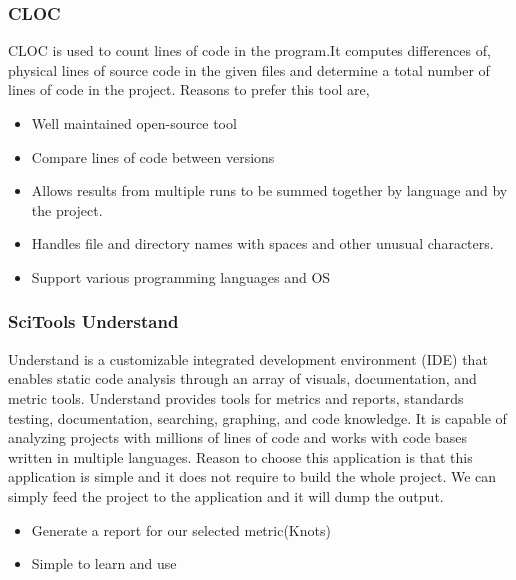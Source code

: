 \documentclass[letterpaper, 12 pt, conference]{ieeetran}  %
\begin{document}
\subsubsection{CLOC}
CLOC is used to count lines of code in the program.It computes differences of, physical lines of source code in the given files and determine a total number of lines of code in the project. Reasons to prefer this tool are, \cite{cloc}
\begin{itemize}
    \item Well maintained open-source tool
    \item Compare lines of code between versions
    \item Allows results from multiple runs to be summed together by language and by the project.
    \item Handles file and directory names with spaces and other unusual characters.
    \item Support various programming languages and OS
\end{itemize}

\subsubsection{SciTools Understand}
Understand is a customizable integrated development environment (IDE) that enables static code analysis through an array of visuals, documentation, and metric tools. Understand provides tools for metrics and reports, standards testing, documentation, searching, graphing, and code knowledge. It is capable of analyzing projects with millions of lines of code and works with code bases written in multiple languages. Reason to choose this application is that this application is simple and it does not require to build the whole project. We can simply feed the project to the application and it will dump the output.
\begin{itemize}
    \item Generate a report for our selected metric(Knots)
    \item Simple to learn and use 
\end{itemize}
\begin{table}[H]
    \centering
\end{table}
\end{document}
